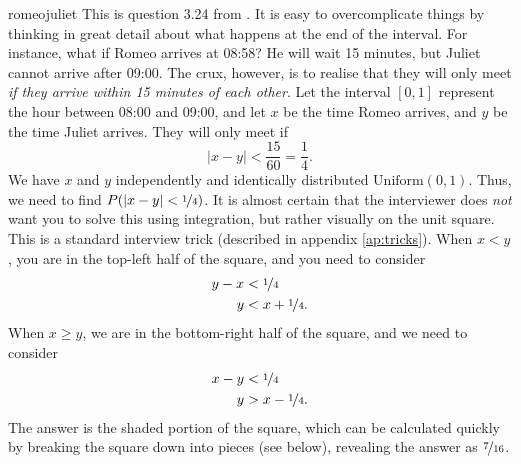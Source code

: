 \begin{answer}{romeojuliet}
This is question 3.24 from \citet{JoshiQA}.
It is easy to overcomplicate things by thinking in great detail about what happens at the end of the interval.
For instance, what if Romeo arrives at 08:58? He will wait 15 minutes, but Juliet cannot arrive after 09:00.
The crux, however, is to realise that they will only meet \emph{if they arrive within 15 minutes of each other}.
Let the interval $[0,1]$ represent the hour between 08:00 and 09:00, and let $x$ be the time Romeo arrives, and $y$ be the time Juliet arrives.
They will only meet if
\[
  |x - y| < \frac{15}{60} = \frac{1}{4}
  \text{.}
\]
We have
$x$ and $y$
independently and identically distributed
$\text{Uniform}(0,1)$.
Thus, we need to find $P(\lvert x - y\rvert < \nicefrac{1}{4})$.
It is almost certain that the interviewer does \emph{not} want you to solve this using integration,
but rather visually on the unit square.
This is a standard interview trick (described in appendix \ref{ap:tricks}).
When $x<y$, you are in the top-left half of the square, and you need to consider
\begin{align*}
  y-x &< \nicefrac{1}{4} \\
  y &< x + \nicefrac{1}{4}
  \text{.}
\end{align*}
When $x \geq y$, we are in the bottom-right half of the square, and we need to consider
\begin{align*}
  x-y &< \nicefrac{1}{4} \\
  y  &> x -\nicefrac{1}{4}
  \text{.}
\end{align*}
The answer is the shaded portion of the square, which can be calculated quickly by breaking the square down into pieces (see below), revealing the answer as $\nicefrac{7}{16}$.
\begin{center}

\end{center}
\end{answer}
